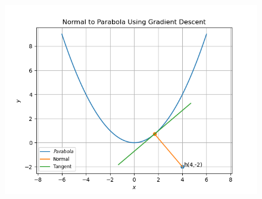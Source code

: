 \documentclass[12pt]{article}
\begin{document}
\begin{figure}[!h]
	\begin{center} 
	    \includegraphics[width=\columnwidth]{figs/12_6_6_4_lagrange}
	\end{center}
\caption{}
\label{fig:Fig1}
\end{figure}
\end{document}
